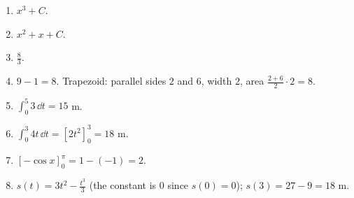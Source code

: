\begin{enumerate}[label=\textbf{\ansnum.\arabic*}]
  \item $x^3+C$.
  \item $x^2+x+C$.
  \item $\frac{8}{3}$.
  \item $9-1=8$. Trapezoid: parallel sides $2$ and $6$, width $2$, area $\frac{2+6}{2}\cdot 2=8$.
  \item $\int_0^5 3\,\dd t=15$ m.
  \item $\int_0^3 4t\,\dd t=[2t^2]_0^3=18$ m.
  \item $[-\cos x]_0^{\pi}=1-(-1)=2$.
  \item[\textbf{10.8}] $s(t)=3t^2-\frac{t^3}{3}$ (the constant is $0$ since $s(0)=0$); $s(3)=27-9=18$ m.
\end{enumerate}
